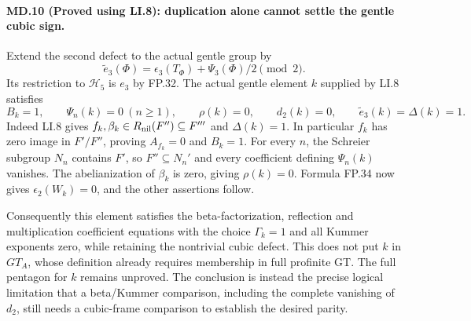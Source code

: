 \paragraph{MD.10 (Proved using LI.8): duplication alone cannot settle the gentle cubic sign.}
Extend the second defect to the actual gentle group by
\[
 \widetilde e_3(\Phi)=\epsilon_3(T_\Phi)+\Psi_3(\Phi)/2\pmod2.
\]
Its restriction to $\mathcal H_5$ is $e_3$ by FP.32.
The actual gentle element $k$ supplied by LI.8 satisfies
\[
 B_k=1,\qquad \Psi_n(k)=0\ (n\geq1),\qquad
 \rho(k)=0,\qquad d_2(k)=0,\qquad
 \widetilde e_3(k)=\Delta(k)=1.
 \tag{MD.10}
\]
Indeed LI.8 gives $f_k,\beta_k\in R_{\rm nil}(F'')\subseteq F'''$
and $\Delta(k)=1$. In particular $f_k$ has zero image in
$F'/F''$, proving $A_{f_k}=0$ and $B_k=1$.
For every $n$, the Schreier subgroup $N_n$ contains $F'$, so
$F''\subseteq N_n'$ and every coefficient defining $\Psi_n(k)$
vanishes. The abelianization of $\beta_k$ is zero, giving
$\rho(k)=0$. Formula FP.34 now gives $\epsilon_2(W_k)=0$,
and the other assertions follow.

Consequently this element satisfies the beta-factorization,
reflection and multiplication coefficient equations with the
choice $\Gamma_k=1$ and all Kummer exponents zero, while retaining
the nontrivial cubic defect. This does not put $k$ in $GT_A$,
whose definition already requires membership in full profinite GT.
The full pentagon for $k$ remains unproved. The conclusion is
instead the precise logical limitation that a beta/Kummer
comparison, including the complete vanishing of $d_2$, still
needs a cubic-frame comparison to establish the desired parity.
